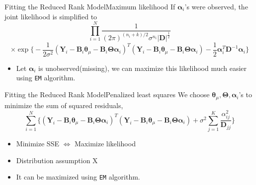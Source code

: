 \documentclass{beamer}
\def \bY {\mathbf{Y}}
\def \btheta {\boldsymbol{\theta}}
\def \bTheta {\boldsymbol{\Theta}}
\def \balpha {\boldsymbol{\alpha}}
\begin{document}
\begin{frame}{Fitting the Reduced Rank Model}{Maximum likelihood}
	If $\balpha_i$'s were observed, the joint likelihood is simplified to
	$$ \prod_{i=1}^N \frac{1}{(2\pi)^{(n_i+k)/2}\sigma^{n_i}|\mathbf{D}|^\frac{1}{2}} $$
	$$ \times \exp \bigg \{ -\frac{1}{2\sigma^2}(\bY_i-\mathbf{B}_i\btheta_{\mu}-\mathbf{B}_i\bTheta\balpha_i)^T(\bY_i-\mathbf{B}_i\btheta_{\mu}-\mathbf{B}_i\bTheta\balpha_i) - \frac{1}{2}\balpha_i^T\mathbf{D}^{-1}\balpha_i \bigg \} $$
	
	\begin{itemize}
		\item {
			Let $\balpha_i$ is unobserved(missing), we can maximize this likelihood much easier using \texttt{EM} algorithm.
		}
	\end{itemize}	
\end{frame}

\begin{frame}{Fitting the Reduced Rank Model}{Penalized least squares}
	We choose $\btheta_{\mu}, \bTheta, \balpha_i$'s to minimize the sum of squared residuals,
	$$ \sum_{i=1}^N \bigg \{ (\bY_i-\mathbf{B}_i\btheta_{\mu}-\mathbf{B}_i\bTheta\balpha_i)^T(\bY_i-\mathbf{B}_i\btheta_{\mu}-\mathbf{B}_i\bTheta\balpha_i) + \sigma^2 \sum_{j=1}^K \frac{\alpha^2_{ij}}{\mathbf{D}_{jj}} \bigg \} $$
	
	\begin{itemize}
		\item {
			Minimize SSE $\Leftrightarrow$ Maximize likelihood
		}
		\item {
			Distribution assumption X
		}
		\item {
			It can be maximized using \texttt{EM} algorithm.
		}	
	\end{itemize}	
\end{frame}
\end{document}
